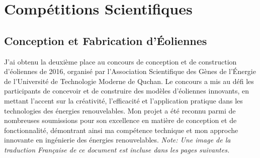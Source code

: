 \documentclass{article}
\begin{document}


\section{Compétitions Scientifiques}

    \subsection{Conception et Fabrication d'Éoliennes}
    J'ai obtenu la deuxième place au concours de conception et de construction d'éoliennes de 2016, organisé par l'Association Scientifique des Gènes de l'Énergie de l'Université de Technologie Moderne de Quchan. Le concours a mis au défi les participants de concevoir et de construire des modèles d'éoliennes innovants, en mettant l'accent sur la créativité, l'efficacité et l'application pratique dans les technologies des énergies renouvelables. Mon projet a été reconnu parmi de nombreuses soumissions pour son excellence en matière de conception et de fonctionnalité, démontrant ainsi ma compétence technique et mon approche innovante en ingénierie des énergies renouvelables.
    \newline
    \newline
    \textit {Note: Une image de la traduction Française de ce document est incluse dans les pages suivantes.}


    \newpage
    
\end{document}
